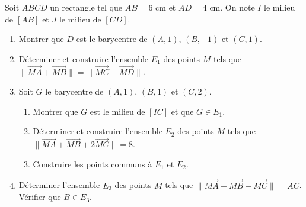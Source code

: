 
\newcommand{\R}{\mathbb{R}}
\newcommand{\vect}[1]{\overrightarrow{#1}}

Soit $ABCD$ un rectangle tel que $AB=6$ cm et $AD=4$ cm. On note $I$ le milieu de $[AB]$ et $J$ le milieu de $[CD]$.
\begin{enumerate}
  \item Montrer que $D$ est le barycentre de $(A,1)$, $(B,-1)$ et $(C,1)$.
  \item Déterminer et construire l'ensemble $E_1$ des points $M$ tels que $\bigl\|\vect{MA}+\vect{MB}\bigr\|=\bigl\|\vect{MC}+\vect{MD}\bigr\|$.
  \item Soit $G$ le barycentre de $(A,1)$, $(B,1)$ et $(C,2)$.
  \begin{enumerate}
    \item Montrer que $G$ est le milieu de $[IC]$ et que $G\in E_1$.
    \item Déterminer et construire l'ensemble $E_2$ des points $M$ tels que $\bigl\|\vect{MA}+\vect{MB}+2\vect{MC}\bigr\|=8$.
    \item Construire les points communs à $E_1$ et $E_2$.
  \end{enumerate}
  \item Déterminer l'ensemble $E_3$ des points $M$ tels que $\bigl\|\vect{MA}-\vect{MB}+\vect{MC}\bigr\|=AC$. Vérifier que $B\in E_3$.
\end{enumerate}

